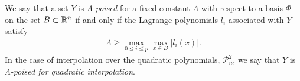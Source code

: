 \documentclass{article}
\begin{document}
We say that a set $Y$ is \emph{$\Lambda$-poised} for a fixed constant $\Lambda$ with respect to a basis $\Phi$ on the set 
$B \subset\mathbb R^n$ if and only if the Lagrange polynomials $l_i$ associated with $Y$ satisfy
\begin{align}
\Lambda \ge \max_{0\le i\le p}\max_{x\in B}|l_i(x)|.
\end{align}
In the case of interpolation over the quadratic polynomials, 
$ \mathcal{P}^2_n$, we say that $Y$ is \emph{$\Lambda$-poised for quadratic interpolation}.



% 
% 
\end{document}
